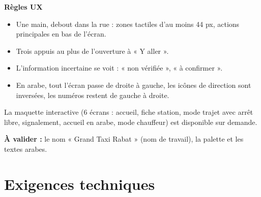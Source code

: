 \documentclass[11pt,a4paper]{article}
\newcommand{\valider}[1]{\begin{avalider}\textbf{À valider :} #1\end{avalider}}
\begin{document}
\textbf{Règles UX}
\begin{itemize}
\item Une main, debout dans la rue : zones tactiles d'au moins 44 px, actions principales en bas de l'écran.
\item Trois appuis au plus de l'ouverture à « Y aller ».
\item L'information incertaine se voit : « non vérifiée », « à confirmer ».
\item En arabe, tout l'écran passe de droite à gauche, les icônes de direction sont inversées, les numéros restent de gauche à droite.
\end{itemize}

La maquette interactive (6 écrans : accueil, fiche station, mode trajet avec arrêt libre, signalement, accueil en arabe, mode chauffeur) est disponible sur demande.
\valider{le nom « Grand Taxi Rabat » (nom de travail), la palette et les textes arabes.}

\Needspace{8cm}
\section{Exigences techniques}
\end{document}
